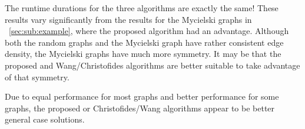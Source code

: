 The runtime durations for the three algorithms are exactly the same!  These results vary significantly from the
results for the Mycielski graphs in \sectionname~\ref{sec:sub:example}, where the proposed algorithm had an
advantage.  Although both the random graphs and the Mycielski graph have rather consistent edge density, the
Mycielski graphs have much more symmetry.  It may be that the proposed and Wang/Christofides algorithms are better
suitable to take advantage of that symmetry.

Due to equal performance for most graphs and better performance for some graphs, the proposed or Christofides/Wang
algorithms appear to be better general case solutions.
